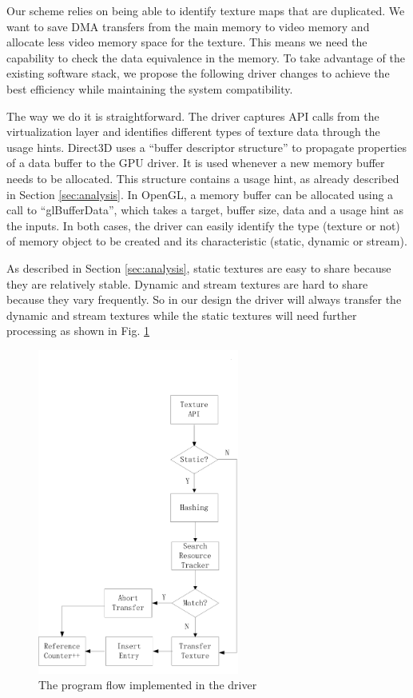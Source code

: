 \documentclass[pageno]{jpaper}
\begin{document}
Our scheme relies on being able to identify texture maps that are duplicated. We want to save DMA transfers from the main memory to video
memory and allocate less video memory space for the texture. This means we need the capability to check the data equivalence in the memory.
To take advantage of the existing software stack, we
propose the following driver changes to achieve the best efficiency
while maintaining the system compatibility.

The way we do it is straightforward. The driver captures API calls from the virtualization layer and identifies different types of texture data through the usage hints. Direct3D uses a ``buffer descriptor structure'' to propagate properties of
	a data buffer to the GPU driver. It is used whenever a new memory buffer needs
	to be allocated. This structure contains a usage hint, as already described in
	Section \ref{sec:analysis}. In OpenGL, a memory buffer can be allocated using a call to
	``glBufferData'', which takes a target, buffer size, data and a usage hint
	as the inputs. In both cases, the driver can easily identify the type (texture or not) of memory object to be created and its characteristic (static, dynamic or stream).

As described in Section \ref{sec:analysis}, static textures are easy to share because they are relatively stable. Dynamic and stream textures are hard to share because they vary frequently. So in our design the driver will always transfer the dynamic and stream textures while the static textures will need further processing as shown in Fig. \ref{fig:flow}

 \begin{figure}
\centering
\vspace{-0.5in}
\includegraphics[width=2.6in]{pics/flow.png}
\caption{The program flow implemented in the driver}
\label{fig:flow}
\end{figure}
\end{document}
